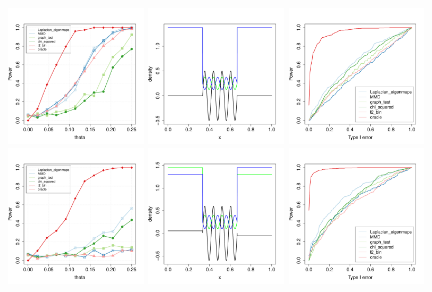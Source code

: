 \documentclass{article}
\newcommand{\1}{\mathbf{1}}
\theoremstyle{alden}
\theoremstyle{aldenthm}
\theoremstyle{definition}
\theoremstyle{remark}
\begin{document}
\begin{figure}
	\includegraphics[width=0.32\textwidth]{plots/stepfunction_sin_theta}
	\includegraphics[width=0.32\textwidth]{plots/stepfunction_sin2_density}
	\includegraphics[width=0.32\textwidth]{plots/stepfunction_sin2_ROC}
	\includegraphics[width=0.32\textwidth]{plots/stepfunction_sin2_theta}
	\includegraphics[width=0.32\textwidth]{plots/stepfunction_sin3_density}
	\includegraphics[width=0.32\textwidth]{plots/stepfunction_sin3_ROC}

\end{figure}
\end{document}
